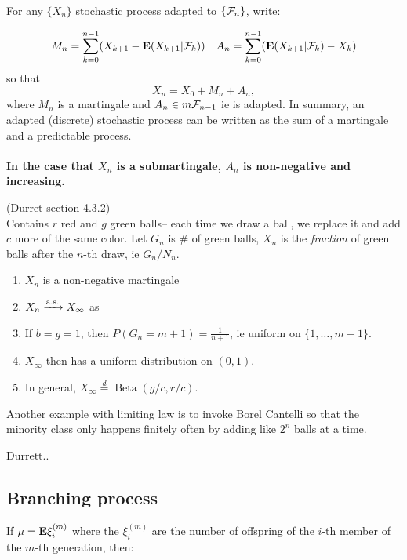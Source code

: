 \documentclass{article}
\begin{document}
\begin{theorem}
For any $\{X_n\}$ stochastic process adapted to $\{\mathcal F_n\}$, write:

$$M_n = \sum_{k=0}^{n-1} (X_{k+1} - \mathbf{E}(X_{k+1}|\mathcal F_k)) \quad A_n = \sum_{k=0}^{n-1} (\mathbf{E}(X_{k+1}|\mathcal F_k) - X_k)$$
so that 
$$X_n = X_0 + M_n +A_n,$$
where $M_n$ is a martingale and $A_n \in m\mathcal F_{n-1}$ ie is adapted. In summary, an adapted (discrete) stochastic process can be written as the sum of a martingale and a predictable process.\\\\
\textbf{In the case that $X_n$ is a submartingale, $A_n$ is non-negative and increasing. 
}\end{theorem}



\begin{example}
(Durret section 4.3.2)\\
Contains $r$ red and $g$ green balls-- each time we draw a ball, we replace it and add $c$ more of the same color. Let $G_n$ is $\#$ of green balls, $X_n$ is the \textit{fraction} of green balls after the $n$-th draw, ie $G_n / N_{n}$. 
\begin{enumerate}
	\item $X_n$ is a non-negative martingale
	\item $X_n \xrightarrow{\mathrm{a.s.}} X_\infty$ as 
	\item If $b=g=1$, then $P(G_n = m+1) = \frac{1}{n+1}$, ie uniform on $\{1,\ldots, m+1\}$. 
	\item $X_\infty$ then has a uniform distribution on $(0,1)$. 
	\item In general, $X_\infty \overset{d}{=} \operatorname{Beta}(g/c,r/c)$. 
\end{enumerate}
Another example with limiting law is to invoke Borel Cantelli so that the minority class only happens finitely often by adding like $2^n$ balls at a time.
\end{example}






\begin{example}
Durrett..
\end{example}






\subsection{Branching process}
If $\mu = \mathbf{E} \xi_i^{(m)}$ where the $\xi_i^{(m)}$ are the number of offspring of the $i$-th member of the $m$-th generation, then:
\end{document}
